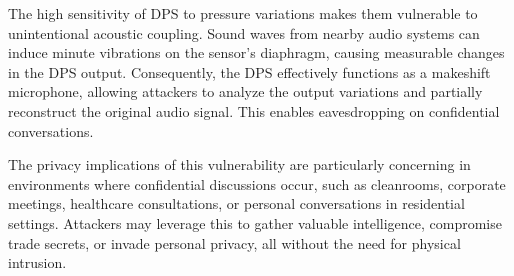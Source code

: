 The high sensitivity of DPS to pressure variations makes them vulnerable to unintentional acoustic coupling. Sound waves from nearby audio systems can induce minute vibrations on the sensor's diaphragm, causing measurable changes in the DPS output. Consequently, the DPS effectively functions as a makeshift microphone, allowing attackers to analyze the output variations and partially reconstruct the original audio signal. This enables eavesdropping on confidential conversations.

The privacy implications of this vulnerability are particularly concerning in environments where confidential discussions occur, such as cleanrooms, corporate meetings, healthcare consultations, or personal conversations in residential settings. Attackers may leverage this to gather valuable intelligence, compromise trade secrets, or invade personal privacy, all without the need for physical intrusion.



